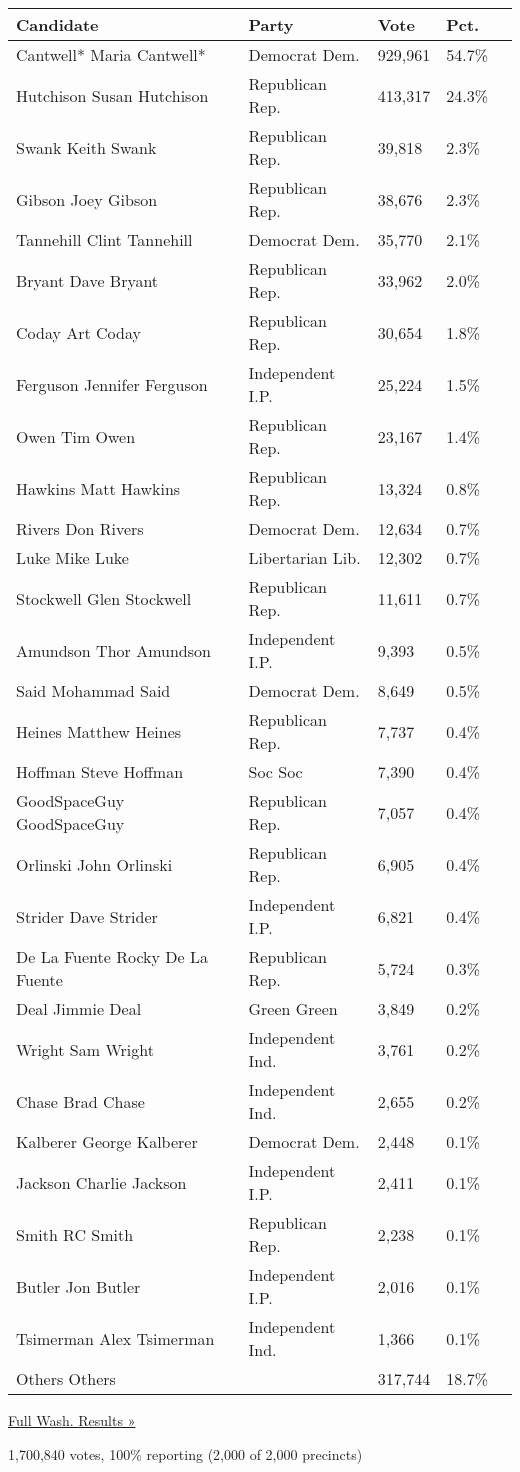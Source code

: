 \begin{longtable}[]{@{}lllll@{}}
\toprule
Candidate & Party & Vote & Pct. &\tabularnewline
\midrule
\endhead
 Cantwell* Maria Cantwell* & Democrat Dem. & 929,961 & 54.7\%
&\tabularnewline
 Hutchison Susan Hutchison & Republican Rep. & 413,317 & 24.3\%
&\tabularnewline
 Swank Keith Swank & Republican Rep. & 39,818 & 2.3\% &\tabularnewline
 Gibson Joey Gibson & Republican Rep. & 38,676 & 2.3\% &\tabularnewline
 Tannehill Clint Tannehill & Democrat Dem. & 35,770 & 2.1\%
&\tabularnewline
 Bryant Dave Bryant & Republican Rep. & 33,962 & 2.0\% &\tabularnewline
 Coday Art Coday & Republican Rep. & 30,654 & 1.8\% &\tabularnewline
 Ferguson Jennifer Ferguson & Independent I.P. & 25,224 & 1.5\%
&\tabularnewline
 Owen Tim Owen & Republican Rep. & 23,167 & 1.4\% &\tabularnewline
 Hawkins Matt Hawkins & Republican Rep. & 13,324 & 0.8\%
&\tabularnewline
 Rivers Don Rivers & Democrat Dem. & 12,634 & 0.7\% &\tabularnewline
 Luke Mike Luke & Libertarian Lib. & 12,302 & 0.7\% &\tabularnewline
 Stockwell Glen Stockwell & Republican Rep. & 11,611 & 0.7\%
&\tabularnewline
 Amundson Thor Amundson & Independent I.P. & 9,393 & 0.5\%
&\tabularnewline
 Said Mohammad Said & Democrat Dem. & 8,649 & 0.5\% &\tabularnewline
 Heines Matthew Heines & Republican Rep. & 7,737 & 0.4\%
&\tabularnewline
 Hoffman Steve Hoffman & Soc Soc & 7,390 & 0.4\% &\tabularnewline
 GoodSpaceGuy GoodSpaceGuy & Republican Rep. & 7,057 & 0.4\%
&\tabularnewline
 Orlinski John Orlinski & Republican Rep. & 6,905 & 0.4\%
&\tabularnewline
 Strider Dave Strider & Independent I.P. & 6,821 & 0.4\%
&\tabularnewline
 De La Fuente Rocky De La Fuente & Republican Rep. & 5,724 & 0.3\%
&\tabularnewline
 Deal Jimmie Deal & Green Green & 3,849 & 0.2\% &\tabularnewline
 Wright Sam Wright & Independent Ind. & 3,761 & 0.2\% &\tabularnewline
 Chase Brad Chase & Independent Ind. & 2,655 & 0.2\% &\tabularnewline
 Kalberer George Kalberer & Democrat Dem. & 2,448 & 0.1\%
&\tabularnewline
 Jackson Charlie Jackson & Independent I.P. & 2,411 & 0.1\%
&\tabularnewline
 Smith RC Smith & Republican Rep. & 2,238 & 0.1\% &\tabularnewline
 Butler Jon Butler & Independent I.P. & 2,016 & 0.1\% &\tabularnewline
 Tsimerman Alex Tsimerman & Independent Ind. & 1,366 & 0.1\%
&\tabularnewline
 Others Others & & 317,744 & 18.7\% &\tabularnewline
\bottomrule
\end{longtable}

\href{https://www.nytimes3xbfgragh.onion/elections/results/washington}{Full
Wash. Results »}

1,700,840 votes, 100\% reporting (2,000 of 2,000 precincts)

